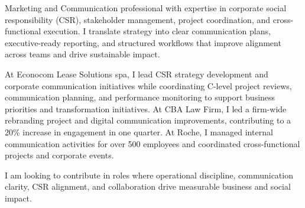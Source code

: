 
\begin{cvparagraph}

Marketing and Communication professional with expertise in corporate social responsibility (CSR), stakeholder management, project coordination, and cross-functional execution. I translate strategy into clear communication plans, executive-ready reporting, and structured workflows that improve alignment across teams and drive sustainable impact.

At Econocom Lease Solutions spa, I lead CSR strategy development and corporate communication initiatives while coordinating C-level project reviews, communication planning, and performance monitoring to support business priorities and transformation initiatives. At CBA Law Firm, I led a firm-wide rebranding project and digital communication improvements, contributing to a 20\% increase in engagement in one quarter. At Roche, I managed internal communication activities for over 500 employees and coordinated cross-functional projects and corporate events.

I am looking to contribute in roles where operational discipline, communication clarity, CSR alignment, and collaboration drive measurable business and social impact.
\end{cvparagraph}
